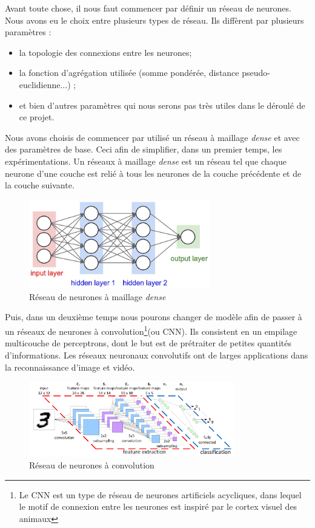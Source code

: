 \documentclass[oneside,13pt,a4paper]{report}
\begin{document}
Avant toute chose, il nous faut commencer par définir un réseau de neurones. Nous avons eu le choix entre plusieurs types de réseau. Ils diffèrent par plusieurs paramètres :

\begin{itemize}
	\item la topologie des connexions entre les neurones;
	\item la fonction d’agrégation utilisée (somme pondérée, distance pseudo-euclidienne...) ;
	\item et bien d'autres paramètres qui nous serons pas très utiles dans le déroulé de ce projet.
\end{itemize}

Nous avons choisis de commencer par utilisé un réseau à maillage \textit{dense} et avec des paramètres de base. Ceci afin de simplifier, dans un premier temps, les expérimentations. Un réseaux à maillage \textit{dense} est un réseau tel que chaque neurone d'une couche est relié à tous les neurones de la couche précédente et de la couche suivante.

\begin{figure}[!h]
	\center
	\includegraphics[width=0.7\textwidth]{img/ann-dense.jpg}
	\caption{Réseau de neurones à maillage \textit{dense}}
\end{figure}


Puis, dans un deuxième temps nous pourons changer de modèle afin de passer à un réseaux de neurones à convolution\footnote{Le CNN est un type de réseau de neurones artificiels acycliques, dans lequel le motif de connexion entre les neurones est inspiré par le cortex visuel des animaux}(ou CNN). Ils consistent en un empilage multicouche de perceptrons, dont le but est de prétraiter de petites quantités d'informations. Les réseaux neuronaux convolutifs ont de larges applications dans la reconnaissance d'image et vidéo.

\begin{figure}[!h]
	\center
	\includegraphics[width=0.8\textwidth]{img/cnn.png}
	\caption{Réseau de neurones à convolution}
\end{figure}
\end{document}
